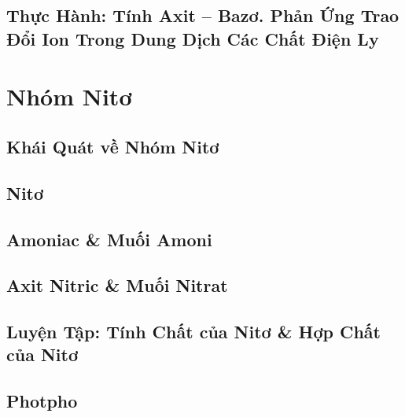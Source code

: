 \documentclass[oneside]{book}
\numberwithin{equation}{section}
\begin{document}
\section{Thực Hành: Tính Axit -- Bazơ. Phản Ứng Trao Đổi Ion Trong Dung Dịch Các Chất Điện Ly}


\chapter{Nhóm Nitơ}

\section{Khái Quát về Nhóm Nitơ}


\section{Nitơ}


\section{Amoniac \& Muối Amoni}


\section{Axit Nitric \& Muối Nitrat}


\section{Luyện Tập: Tính Chất của Nitơ \& Hợp Chất của Nitơ}


\section{Photpho}
\end{document}
